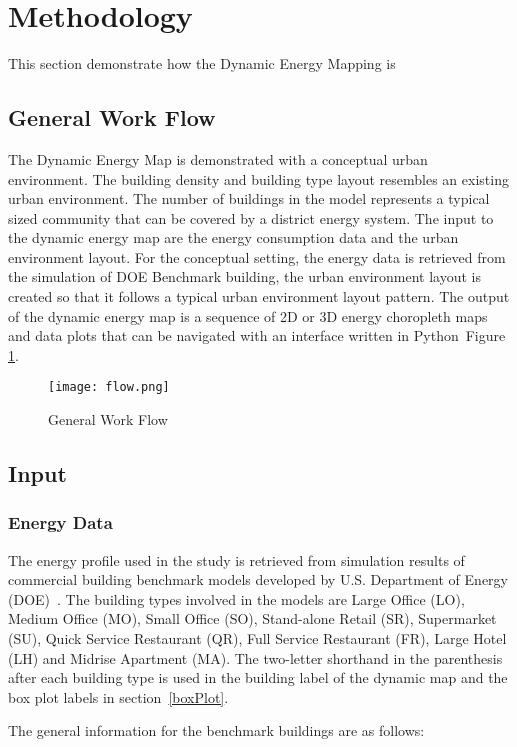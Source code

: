 \documentclass[hidelinks,12pt]{article}
\newcommand{\fref}[1]{Figure \ref{#1}}
\begin{document}
\section{Methodology}
This section demonstrate how the Dynamic Energy Mapping is 

\subsection{General Work Flow}
The Dynamic Energy Map is demonstrated with a conceptual urban
environment. The building density and building type layout resembles
an existing urban environment. The number of buildings in the model
represents a typical sized community that can be covered by a district
energy system. The input to the dynamic energy map are the energy
consumption data and the urban environment layout. For the conceptual
setting, the energy data is retrieved from the simulation of DOE
Benchmark building, the urban environment layout is created so that it
follows a typical urban environment layout pattern. The output of the
dynamic energy map is a sequence of 2D or 3D energy choropleth maps
and data plots that can be navigated with an interface written in
Python~\fref{fig:flow}.

\begin{figure}[htbp]
  \centering
  \texttt{[image: flow.png]}
  \caption{General Work Flow}
  \label{fig:flow}
\end{figure}

\subsection{Input}
\subsubsection{Energy Data}
The energy profile used in the study is retrieved from simulation
results of commercial building benchmark models developed by
U.S. Department of Energy (DOE)~\cite{DOE2015}. The building types
involved in the models are Large Office (LO), Medium Office (MO),
Small Office (SO), Stand-alone Retail (SR), Supermarket (SU), Quick
Service Restaurant (QR), Full Service Restaurant (FR), Large Hotel
(LH) and Midrise Apartment (MA). The two-letter shorthand in the
parenthesis after each building type is used in the building label of
the dynamic map and the box plot labels in section~\ref{boxPlot}.

The general information for the benchmark buildings are as follows:
\end{document}
